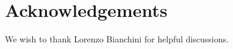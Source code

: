 \section{Acknowledgements}
\label{sec:acknowledgments}

We wish to thank Lorenzo Bianchini for helpful discussions.
